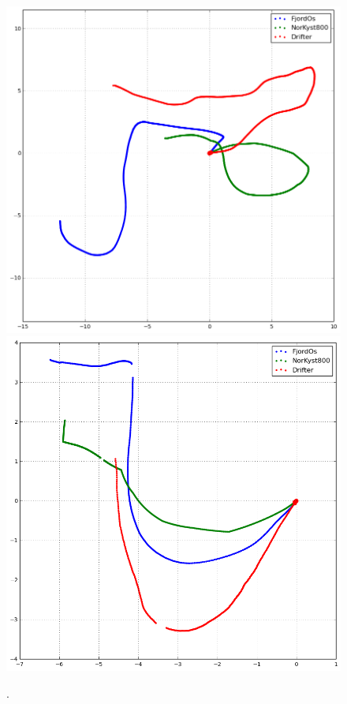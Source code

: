 \begin{figure}[ht]
\centerline{
\includegraphics*[width=.5\textwidth]{Figurer/opendrift/skillscore/drop101i6}
\includegraphics*[width=.5\textwidth]{Figurer/opendrift/skillscore/drop102i9}
}
\caption{\small
.}
\label{fig:opendrift_trajectories3}
\end{figure}



\clearpage 
